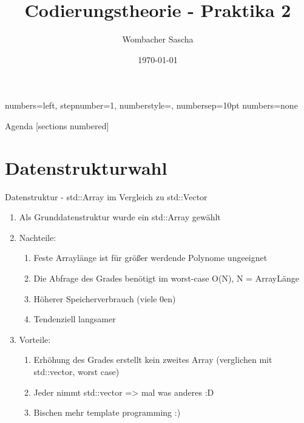 \documentclass{beamer}
\title{Codierungstheorie - Praktika 2}
\date{\today}
\author{Wombacher Sascha \newline}
\begin{document}
  {numbers=left, stepnumber=1, numberstyle=\tiny, numbersep=10pt}
  {numbers=none}


  \maketitle
  \begin{frame}{Agenda}
    [sections numbered]
    \tableofcontents[hideallsubsections]
  \end{frame}

  \section{Datenstrukturwahl}
  \begin{frame}{Datenstruktur \newline - std::Array im Vergleich zu std::Vector}
  	\begin{enumerate}
	  	\item Als Grunddatenstruktur wurde ein std::Array gewählt
	  	\item Nachteile:
	  	\begin{enumerate}
		  	\item Feste Arraylänge ist für größer werdende Polynome ungeeignet
		  	\item Die Abfrage des Grades benötigt im worst-case \newline O(N), N = ArrayLänge
		  	\item Höherer Speicherverbrauch (viele 0en)
		  	\item Tendenziell langsamer
	  	\end{enumerate}
	  	\item Vorteile:
	  	\begin{enumerate}
		  	\item Erhöhung des Grades erstellt kein zweites Array \newline (verglichen mit std::vector, worst case)
		  	\item Jeder nimmt std::vector => mal was anderes :D
		  	\item Bischen mehr template programming :)
	  	\end{enumerate}
	\end{enumerate}
  \end{frame}
  
\end{document}
